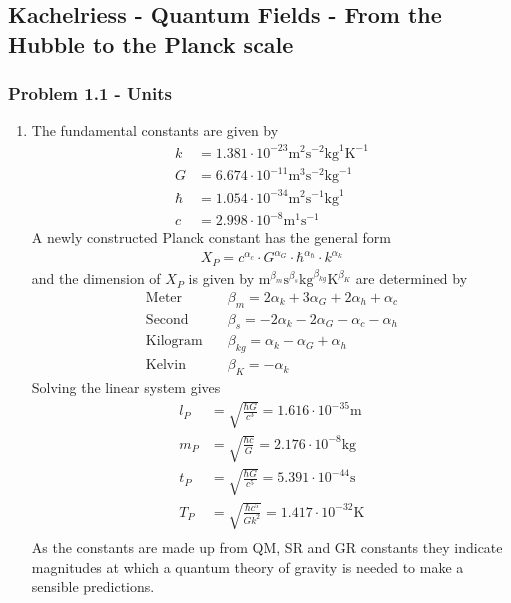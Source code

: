 \documentclass[10pt,a4paper]{book}
\theoremstyle{definition}
\begin{document}
\subsection{{\sc Kachelriess} - Quantum Fields - From the Hubble to the Planck scale}
\subsubsection{Problem 1.1 - Units}
\begin{enumerate}
\item The fundamental constants are given by
\begin{align}
    k    &=1.381\cdot10^{-23} \text{m}^2\text{s}^{-2}\text{kg}^{ 1}\text{K}^{-1}\\
    G    &=6.674\cdot10^{-11} \text{m}^3\text{s}^{-2}\text{kg}^{-1}\\
    \hbar&=1.054\cdot10^{-34} \text{m}^2\text{s}^{-1}\text{kg}^{ 1}\\
    c    &=2.998\cdot10^{-8}  \text{m}^1\text{s}^{-1}
\end{align}
A newly constructed Planck constant has the general form
\begin{align}
    X_P=c^{\alpha_c}\cdot G^{\alpha_G}\cdot \hbar^{\alpha_\hbar}\cdot k^{\alpha_k}
\end{align}
and the dimension of $X_P$ is given by $\text{m}^{\beta_m}\text{s}^{\beta_s}\text{kg}^{\beta_{kg}}\text{K}^{\beta_K}$ are determined by
\begin{align}
    \text{Meter}\quad    &\beta_m=2\alpha_k+3\alpha_G+2\alpha_h+\alpha_c\\
    \text{Second}\quad   &\beta_s=-2\alpha_k-2\alpha_G-\alpha_c-\alpha_h\\
    \text{Kilogram}\quad &\beta_{kg}=\alpha_k-\alpha_G+\alpha_h\\
    \text{Kelvin}\quad   &\beta_K=-\alpha_k
\end{align}
Solving the linear system gives
\begin{align}
    l_P&=\sqrt{\frac{\hbar G}{c^3}}=1.616\cdot 10^{-35}\text{m}\\
    m_P&=\sqrt{\frac{\hbar c}{G}}=2.176\cdot 10^{-8}\text{kg}\\
    t_P&=\sqrt{\frac{\hbar G}{c^5}}=5.391\cdot 10^{-44}\text{s}\\
    T_P&=\sqrt{\frac{\hbar c^5}{Gk^2}}=1.417\cdot 10^{-32}\text{K}\\
\end{align}
As the constants are made up from QM, SR and GR constants they indicate magnitudes at which a quantum theory of gravity is needed to make a sensible predictions.


\end{enumerate}
\end{document}
